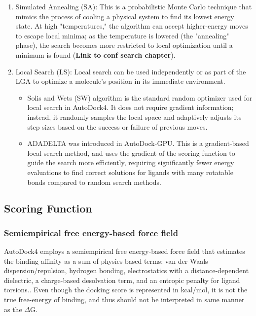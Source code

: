\documentclass[12pt, a4paper]{article}
\begin{document}
\begin{enumerate}
\item Simulated Annealing (SA): 
This is a probabilistic Monte Carlo technique that mimics the process of cooling a physical system to find its lowest energy state. At high "temperatures," the algorithm can accept higher-energy moves to escape local minima; as the temperature is lowered (the "annealing" phase), the search becomes more restricted to local optimization until a minimum is found (\textbf{Link to conf search chapter}).

\item Local Search (LS): 
Local search can be used independently or as part of the LGA to optimize a molecule's position in its immediate environment.
\begin{itemize}
\item Solis and Wets (SW) algorithm is the standard random optimizer used for local search in AutoDock4. It does not require gradient information; instead, it randomly samples the local space and adaptively adjusts its step sizes based on the success or failure of previous moves.
\item ADADELTA was introduced in AutoDock-GPU. This is a gradient-based local search method, and uses the gradient of the scoring function to guide the search more efficiently, requiring significantly fewer energy evaluations to find correct solutions for ligands with many rotatable bonds compared to random search methods.
\end{itemize}
\end{enumerate}

\subsection{Scoring Function}

\subsubsection{Semiempirical free energy-based force field}

AutoDock4 employs a semiempirical free energy-based force field that estimates the binding affinity as a sum of physics-based terms: van der Waals dispersion/repulsion, hydrogen bonding, electrostatics with a distance-dependent dielectric, a charge-based desolvation term, and an entropic penalty for ligand torsions.\cite{CH7_Huey2007,CH7_SantosMartins2021}. Even though the docking score is represented in kcal/mol, it is not the true free-energy of binding, and thus should not be interpreted in same manner as the $\Delta\text{G}$. 
\end{document}
